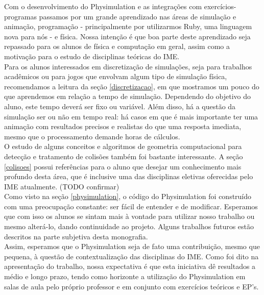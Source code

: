
Com o desenvolvimento do Physimulation e as integrações com exercícios-programas passamos por um grande aprendizado nas áreas de simulação e animação, programação - principalmente por utilizarmos Ruby, uma linguagem nova para nós - e física. Nossa intenção é que boa parte deste aprendizado seja repassado para os alunos de física e computação em geral, assim como a motivação para o estudo de disciplinas teóricas do IME. \\

Para os alunos interessados em discretização de simulações, seja para trabalhos acadêmicos ou para jogos que envolvam algum tipo de simulação física, recomendamos a leitura da seção \ref{discretizacao}, em que mostramos um pouco do que aprendemos em relação a tempo de simulação. Dependendo do objetivo do aluno, este tempo deverá ser fixo ou variável. Além disso, há a questão da simulação ser ou não em tempo real: há casos em que é mais importante ter uma animação com resultados precisos e realistas do que uma resposta imediata, mesmo que o processamento demande horas de cálculos. \\

O estudo de alguns conceitos e algoritmos de geometria computacional para detecção e tratamento de colisões também foi bastante interessante. A seção \ref{colisoes} possui referências para o aluno que desejar um conhecimento mais profundo desta área, que é inclusive uma das disciplinas eletivas oferecidas pelo IME atualmente. (TODO confirmar) \\

Como visto na seção \ref{physimulation}, o código do Physimulation foi construído com uma preocupação constante: ser fácil de entender e de modificar. Esperamos que com isso os alunos se sintam mais à vontade para utilizar nosso trabalho ou mesmo alterá-lo, dando continuidade ao projeto. Alguns trabalhos futuros estão descritos na parte subjetiva desta monografia. \\

Assim, esperamos que o Physimulation seja de fato uma contribuição, mesmo que pequena, à questão de contextualização das disciplinas do IME. Como foi dito na apresentação do trabalho, nossa expectativa é que esta iniciativa dê resultados a médio e longo prazo, tendo como horizonte a utilização do Physimulation em salas de aula pelo próprio professor e em conjunto com exercícios teóricos e EP's.
